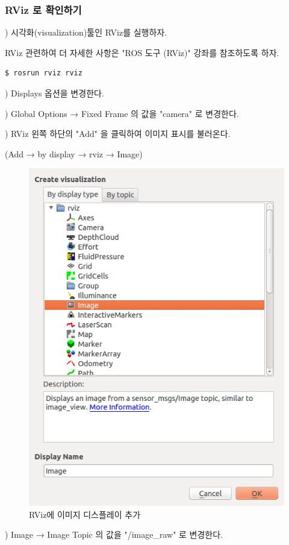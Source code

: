 \subsubsection{RViz 로 확인하기}

\setcounter{num}{0}

\noindent
{}\thenum) 시각화(visualization)툴인 RViz를 실행하자.

\noindent
RViz 관련하여 더 자세한 사항은 "ROS 도구 (RViz)" 강좌를 참조하도록 하자.

\begin{lstlisting}[language=ROS]
$ rosrun rviz rviz
\end{lstlisting}

\noindent
{}\thenum) Displays 옵션을 변경한다.

\vspace{\baselineskip}
\noindent
{}) Global Options → Fixed Frame 의 값을 "camera" 로 변경한다.

\vspace{\baselineskip}
\noindent
{}) RViz 왼쪽 하단의 "Add" 을 클릭하여 이미지 표시를 불러온다.

\noindent
(Add → by display → rviz → Image)

\begin{figure}[h]
\centering\includegraphics[width=0.5\columnwidth]{pictures/chapter9/add_display_of_rviz.png}
\caption{RViz에 이미지 디스플레이 추가}
\end{figure}

\vspace{\baselineskip}
\noindent
{}) Image → Image Topic 의 값을 "/image\_raw" 로 변경한다.

